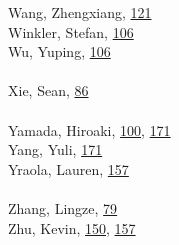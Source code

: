 \documentclass[11pt,oneside]{book}
\begin{document}
\begin{multicols}{2}
Wang, Zhengxiang, \hyperlink{page.121}{121}\\
Winkler, Stefan, \hyperlink{page.106}{106}\\
Wu, Yuping, \hyperlink{page.106}{106}\\
\\ %
Xie, Sean, \hyperlink{page.86}{86}\\
\\ %
Yamada, Hiroaki, \hyperlink{page.100}{100}, \hyperlink{page.171}{171}\\
Yang, Yuli, \hyperlink{page.171}{171}\\
Yraola, Lauren, \hyperlink{page.157}{157}\\
\\ %
Zhang, Lingze, \hyperlink{page.79}{79}\\
Zhu, Kevin, \hyperlink{page.150}{150}, \hyperlink{page.157}{157}\\
\\ %
\end{multicols}
\end{document}
